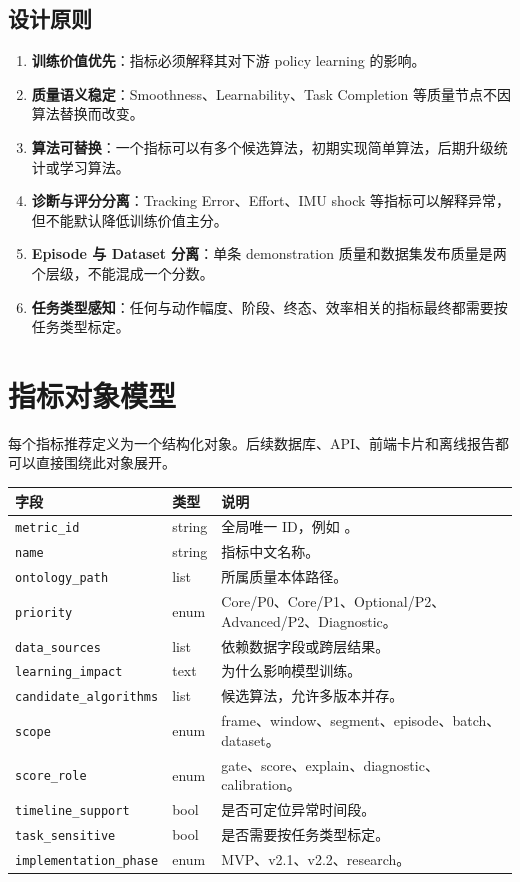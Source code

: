 \documentclass[UTF8,zihao=-4]{ctexart}
\newcommand{\Code}[1]{\texttt{#1}}
\newcommand{\MID}[1]{\texttt{\seqsplit{#1}}}
\newcommand{\Term}[1]{\textbf{#1}}
\begin{document}
\subsection{设计原则}

\begin{enumerate}
  \item \Term{训练价值优先}：指标必须解释其对下游 policy learning 的影响。
  \item \Term{质量语义稳定}：Smoothness、Learnability、Task Completion 等质量节点不因算法替换而改变。
  \item \Term{算法可替换}：一个指标可以有多个候选算法，初期实现简单算法，后期升级统计或学习算法。
  \item \Term{诊断与评分分离}：Tracking Error、Effort、IMU shock 等指标可以解释异常，但不能默认降低训练价值主分。
  \item \Term{Episode 与 Dataset 分离}：单条 demonstration 质量和数据集发布质量是两个层级，不能混成一个分数。
  \item \Term{任务类型感知}：任何与动作幅度、阶段、终态、效率相关的指标最终都需要按任务类型标定。
\end{enumerate}

\section{指标对象模型}

每个指标推荐定义为一个结构化对象。后续数据库、API、前端卡片和离线报告都可以直接围绕此对象展开。

\begin{longtable}{L{3.8cm} L{2.7cm} L{7.0cm}}
\toprule
字段 & 类型 & 说明 \\
\midrule
\Code{metric\_id} & string & 全局唯一 ID，例如 \MID{DBQ-01}。 \\
\Code{name} & string & 指标中文名称。 \\
\Code{ontology\_path} & list & 所属质量本体路径。 \\
\Code{priority} & enum & Core/P0、Core/P1、Optional/P2、Advanced/P2、Diagnostic。 \\
\Code{data\_sources} & list & 依赖数据字段或跨层结果。 \\
\Code{learning\_impact} & text & 为什么影响模型训练。 \\
\Code{candidate\_algorithms} & list & 候选算法，允许多版本并存。 \\
\Code{scope} & enum & frame、window、segment、episode、batch、dataset。 \\
\Code{score\_role} & enum & gate、score、explain、diagnostic、calibration。 \\
\Code{timeline\_support} & bool & 是否可定位异常时间段。 \\
\Code{task\_sensitive} & bool & 是否需要按任务类型标定。 \\
\Code{implementation\_phase} & enum & MVP、v2.1、v2.2、research。 \\
\bottomrule
\end{longtable}
\end{document}

